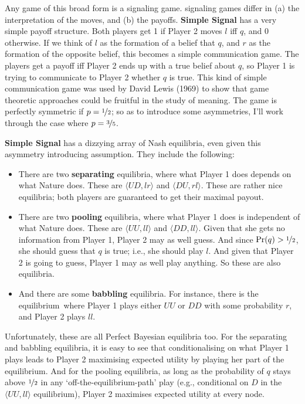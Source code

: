 \documentclass[
  11pt,
  letterpaper,
]{scrbook}
\providecommand{\tightlist}{%
  \setlength{\itemsep}{0pt}\setlength{\parskip}{0pt}}
\begin{document}
Any game of this broad form is a signaling game. signaling games differ
in (a) the interpretation of the moves, and (b) the payoffs.
\textbf{Simple Signal} has a very simple payoff structure. Both players
get 1 if Player 2 moves \(l\) iff \(q\), and 0 otherwise. If we think of
\(l\) as the formation of a belief that \(q\), and \(r\) as the
formation of the opposite belief, this becomes a simple communication
game. The players get a payoff iff Player 2 ends up with a true belief
about \(q\), so Player 1 is trying to communicate to Player 2 whether
\(q\) is true. This kind of simple communication game was used by David
Lewis (1969) to show that game theoretic approaches could be fruitful in
the study of meaning. The game is perfectly symmetric if
\(p = \nicefrac{1}{2}\); so as to introduce some asymmetries, I'll work
through the case where \(p = \nicefrac{3}{5}\).

\textbf{Simple Signal} has a dizzying array of Nash equilibria, even
given this asymmetry introducing assumption. They include the following:

\begin{itemize}
\tightlist
\item
  There are two \textbf{separating} equilibria, where what Player 1 does
  depends on what Nature does. These are \(\langle UD, lr \rangle\) and
  \(\langle DU, rl \rangle\). These are rather nice equilibria; both
  players are guaranteed to get their maximal payout.
\item
  There are two \textbf{pooling} equilibria, where what Player 1 does is
  independent of what Nature does. These are \(\langle UU, ll \rangle\)
  and \(\langle DD, ll \rangle\). Given that she gets no information
  from Player 1, Player 2 may as well guess. And since
  \(\Pr(q) > \nicefrac{1}{2}\), she should guess that \(q\) is true;
  i.e., she should play \(l\). And given that Player 2 is going to
  guess, Player 1 may as well play anything. So these are also
  equilibria.
\item
  And there are some \textbf{babbling} equilibria. For instance, there
  is the equilibrium~where Player 1 plays either \(UU\) or \(DD\) with
  some probability \(r\), and Player 2 plays \(ll\).
\end{itemize}

Unfortunately, these are all Perfect Bayesian equilibria too. For the
separating and babbling equilibria, it is easy to see that
conditionalising on what Player 1 plays leads to Player 2 maximising
expected utility by playing her part of the equilibrium. And for the
pooling equilibria, as long as the probability of \(q\) stays above
\(\nicefrac{1}{2}\) in any `off-the-equilibrium-path' play (e.g.,
conditional on \(D\) in the \(\langle UU, ll \rangle\) equilibrium),
Player 2 maximises expected utility at every node.
\end{document}
